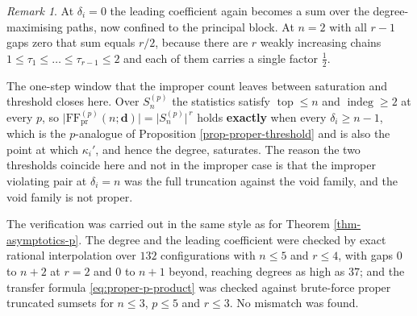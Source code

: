 \documentclass[11pt, a4paper, abstract=yes]{scrartcl}
\theoremstyle{definition}
\theoremstyle{remark}
\newtheorem{remark}[definition]{Remark}
\theoremstyle{plain}
\newcommand{\vek}[1]{\boldsymbol{#1}}
\newcommand{\indeg}{\operatorname{indeg}}
\newcommand{\tp}{\operatorname{top}}
\begin{document}
\begin{remark}
At \(\delta_i=0\) the leading coefficient again becomes a sum over the degree-maximising paths,
now confined to the principal block. At \(n=2\) with all \(r-1\) gaps zero that sum equals
\(r/2\), because there are \(r\) weakly increasing chains
\(1\le\tau_1\le\dots\le\tau_{r-1}\le2\) and each of them carries a single factor
\(\tfrac12\).

The one-step window that the improper count leaves between saturation and threshold closes here.
Over \(S_n^{(p)}\) the statistics satisfy \(\tp\le n\) and \(\indeg\ge2\) at every \(p\), so
\(\lvert\mathrm{FF}^{(p)}_{\mathrm{pr}}(n;\vek d)\rvert=\lvert S_n^{(p)}\rvert^{\,r}\) holds \textbf{exactly}
when every \(\delta_i\ge n-1\), which is the \(p\)-analogue of
Proposition \ref{prop-proper-threshold} and is also the point at which \(\kappa_i'\), and hence the
degree, saturates. The reason the two thresholds coincide here and not in the improper case is that
the improper violating pair at \(\delta_i=n\) was the full truncation against the void family,
and the void family is not proper.

The verification was carried out in the same style as for Theorem \ref{thm-asymptotics-p}. The degree
and the leading coefficient were checked by exact rational interpolation over \(132\)
configurations with \(n\le5\) and \(r\le4\), with gaps \(0\) to \(n+2\) at \(r=2\) and \(0\) to
\(n+1\) beyond, reaching degrees as high as \(37\); and the transfer formula \eqref{eq:proper-p-product} was checked against brute-force
proper truncated sumsets for \(n\le3\), \(p\le5\) and \(r\le3\). No mismatch was found.
\label{rem-proper-p}
\end{remark}
\end{document}
